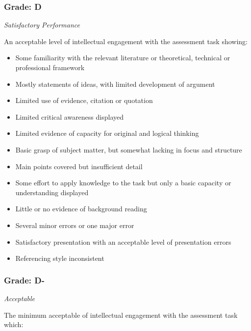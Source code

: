 \subsubsection*{Grade: D}

\textit{Satisfactory Performance}

An acceptable level of intellectual engagement with the assessment task showing:

\begin{itemize}
	\item Some familiarity with the relevant literature or theoretical, technical or professional framework
	\item Mostly statements of ideas, with limited development of argument
	\item Limited use of evidence, citation or quotation
	\item Limited critical awareness displayed
	\item Limited evidence of capacity for original and logical thinking
	\item Basic grasp of subject matter, but somewhat lacking in focus and structure
	\item Main points covered but insufficient detail
	\item Some effort to apply knowledge to the task but only a basic capacity or understanding displayed
	\item Little or no evidence of background reading
	\item Several minor errors or one major error
	\item Satisfactory presentation with an acceptable level of presentation errors
	\item Referencing style inconsistent
\end{itemize}


\subsubsection*{Grade: D-}

\textit{Acceptable}

The minimum acceptable of intellectual engagement with the assessment task which:

